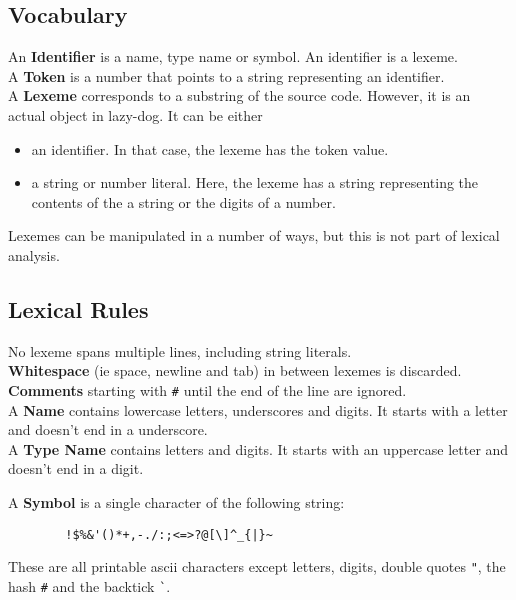 \documentclass{article}
\begin{document}
\subsection{Vocabulary}

An \textbf{Identifier} is a name, type name or symbol.
An identifier is a lexeme.\\

A \textbf{Token} is a number that points to a string
representing an identifier.\\

A \textbf{Lexeme} corresponds to a substring of 
the source code. However, it is an actual object in lazy-dog.
It can be either
\begin{itemize}
    \item an identifier. 
    In that case, the lexeme has the token value.
    \item a string or number literal.
    Here, the lexeme has a string representing
    the contents of the a string or the digits
    of a number.
\end{itemize}
Lexemes can be manipulated in a number of ways,
but this is not part of lexical analysis.

\subsection{Lexical Rules}
No lexeme spans multiple lines, including string literals.\\

\textbf{Whitespace} (ie space, newline and tab) in between
lexemes is discarded.\\

\textbf{Comments} starting with \verb.#. until the end of the line
are ignored.\\

A \textbf{Name} contains lowercase letters,
underscores and digits.
It starts with a letter and doesn't end in a underscore.\\

A \textbf{Type Name} contains letters and digits.
It starts with an uppercase letter
and doesn't end in a digit.\\

\begin{samepage}
    A \textbf{Symbol} is a single character of the
    following string:
    \begin{verbatim}
        !$%&'()*+,-./:;<=>?@[\]^_{|}~
    \end{verbatim}
    These are all printable ascii characters except letters, digits, 
    double quotes \verb."., the hash \verb.#. and
    the backtick \verb.`..
\end{samepage}\\
\end{document}
